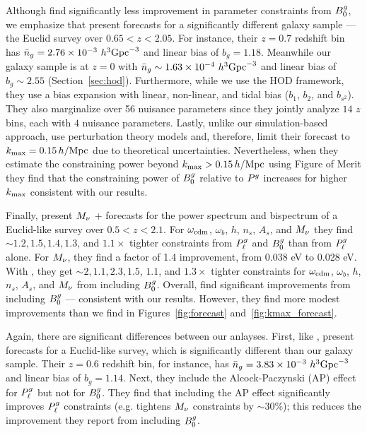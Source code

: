 Although \cite{yankelevich2019} find significantly less improvement in
parameter constraints from $B^g_0$, we emphasize that \cite{yankelevich2019}
present forecasts for a significantly different galaxy sample --- \ie the
Euclid survey over $0.65 < z < 2.05$. For instance, their $z = 0.7$ redshift
bin has $\bar{n}_g = 2.76 \times 10^{-3}~h^3{\rm Gpc}^{-3}$ and linear bias of
$b_g = 1.18$. Meanwhile our galaxy sample is at $z=0$ with $\bar{n}_g \sim 1.63\times
10^{-4}~h^3{\rm Gpc}^{-3}$ and linear bias of $b_g \sim 2.55$
(Section~\ref{sec:hod}). Furthermore, while we use the HOD framework, they use
a bias expansion with linear, non-linear, and tidal bias ($b_1$, $b_2$, and
$b_{s^2}$). They also marginalize over 56 nuisance parameters since they
jointly analyze $14$ $z$ bins, each with $4$ nuisance parameters.  Lastly,
unlike our simulation-based approach, \cite{yankelevich2019} use perturbation
theory models and, therefore, limit their forecast to $k_{\rm max} = 0.15\,h/\mathrm{Mpc}$ due
to theoretical uncertainties. Nevertheless, when they estimate the constraining
power beyond $k_{\rm max} > 0.15\,h/\mathrm{Mpc}$ using Figure of Merit they find that the
constraining power of $B^g_0$ relative to $P^g$ increases for higher $k_{\rm max}$
consistent with our results. 

Finally, \cite{chudaykin2019} present $M_\nu$ + \lcdm forecasts for the power
spectrum and bispectrum of a Euclid-like survey over $0.5 < z < 2.1$. For
$\omega_{\rm cdm}$, $\omega_b$, $h$, $n_s$, $A_s$, and $M_\nu$ they find
${\sim}1.2, 1.5, 1.4, 1.3$, and $1.1\times$ tighter constraints from $P^g_{\ell}$ and
$B^g_0$ than from $P^g_{\ell}$ alone. For $M_\nu$, they find a factor of 1.4 improvement, 
from 0.038 eV to 0.028 eV. With \planck, they get ${\sim}2, 1.1, 2.3, 1.5$,
$1.1$, and $1.3\times$ tighter constraints for $\omega_{\rm cdm}$, $\omega_b$,
$h$, $n_s$, $A_s$, and $M_\nu$ from including $B^g_0$. Overall, \cite{chudaykin2019} 
find significant improvements from including $B^g_0$ --- consistent with our
results. However, they find more modest improvements than we find in 
Figures~\ref{fig:forecast} and~\ref{fig:kmax_forecast}. 

Again, there are significant differences between our anlayses. First, like
\cite{yankelevich2019}, \cite{chudaykin2019} present forecasts for a
Euclid-like survey, which is significantly different than our galaxy sample.
Their $z = 0.6$ redshift bin, for instance, has $\bar{n}_g = 3.83 \times 10^{-3}~h^3{\rm
Gpc}^{-3}$ and linear bias of $b_g = 1.14$. Next, they include the
Alcock-Paczynski (AP) effect for $P^g_{\ell}$ but not for $B^g_0$. They find that
including the AP effect significantly improves $P^g_{\ell}$ constraints (e.g.
tightens $M_\nu$ constraints by ${\sim}30\%$); this reduces the improvement
they report from including $B^g_0$. 

